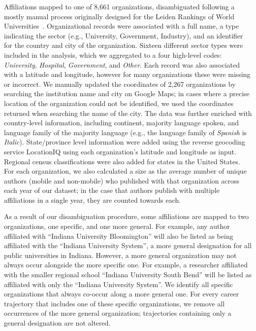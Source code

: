 \documentclass[12pt]{article} %
\begin{document}
Affiliations mapped to one of 8,661 organizations, disambiguated following a mostly manual process originally designed for the Leiden Rankings of World Universities~\cite{waltman2012leidenrankings}. 
Organizational records were associated with a full name, a type indicating the sector (e.g., University, Government, Industry), and an identifier for the country and city of the organization. 
Sixteen different sector types were included in the analysis, which we aggregated to a four high-level codes: \textit{University}, \textit{Hospital}, \textit{Government}, and \textit{Other}. 
Each record was also associated with a latitude and longitude, however for many organizations these were missing or incorrect. We manually updated the coordinates of 2,267 organizations by searching the institution name and city on Google Maps;
in cases where a precise location of the organization could not be identified, we used the coordinates returned when searching the name of the city.
The data was further enriched with country-level information, including continent, majority language spoken, and language family of the majority language (e.g., the language family of \textit{Spanish} is \textit{Italic}).  
State/province level  information were added using the reverse geocoding service LocationIQ using each organization's latitude and longitude as input. 
Regional census classifications were also added for states in the United States.
For each organization, we also calculated a size as the average number of unique authors (mobile and non-mobile) who published with that organization across each year of our dataset;
in the case that authors publish with multiple affiliations in a single year, they are counted towards each. 

As a result of our disambiguation procedure, some affiliations are mapped to two organizations, one specific, and one more general.
For example, any author affiliated with ``Indiana University Bloomington'' will also be listed as being affiliated with the ``Indiana University System'', a more general designation for all public universities in Indiana. 
However, a more general organization may not always occur alongside the more specific one.
For example, a researcher affiliated with the smaller regional school ``Indiana University South Bend'' will be listed as affiliated with only the ``Indiana University System''. 
We identify all specific organizations that always co-occur along a more general one.
For every career trajectory that includes one of these specific organizations, we remove all occurrences of the more general organization;
trajectories containing only a general designation are not altered. 
\end{document}
